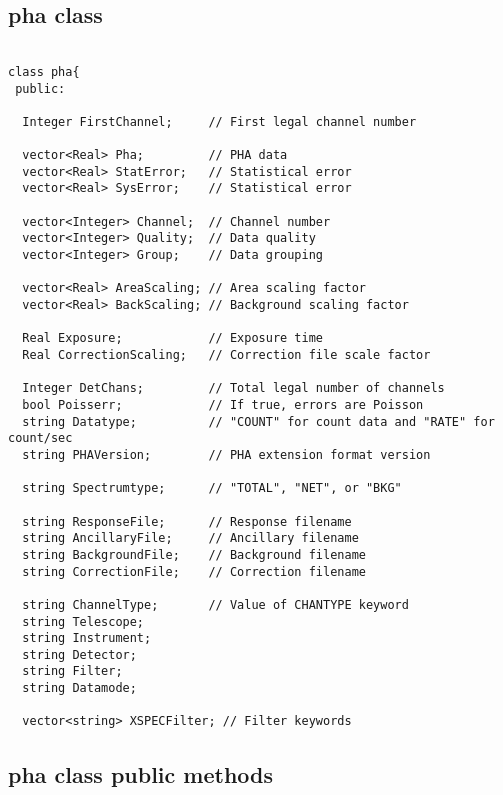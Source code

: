 \documentclass[11pt]{book}
\begin{document}
\subsection{pha class}

\begin{verbatim}

class pha{
 public:

  Integer FirstChannel;     // First legal channel number

  vector<Real> Pha;         // PHA data
  vector<Real> StatError;   // Statistical error 
  vector<Real> SysError;    // Statistical error 

  vector<Integer> Channel;  // Channel number
  vector<Integer> Quality;  // Data quality 
  vector<Integer> Group;    // Data grouping 

  vector<Real> AreaScaling; // Area scaling factor 
  vector<Real> BackScaling; // Background scaling factor 

  Real Exposure;            // Exposure time 
  Real CorrectionScaling;   // Correction file scale factor 

  Integer DetChans;         // Total legal number of channels
  bool Poisserr;            // If true, errors are Poisson 
  string Datatype;          // "COUNT" for count data and "RATE" for count/sec 
  string PHAVersion;        // PHA extension format version 

  string Spectrumtype;      // "TOTAL", "NET", or "BKG" 

  string ResponseFile;      // Response filename 
  string AncillaryFile;     // Ancillary filename 
  string BackgroundFile;    // Background filename 
  string CorrectionFile;    // Correction filename 

  string ChannelType;       // Value of CHANTYPE keyword 
  string Telescope;                                          
  string Instrument;
  string Detector;
  string Filter;
  string Datamode;

  vector<string> XSPECFilter; // Filter keywords 
\end{verbatim}

\subsection{pha class public methods}
\end{document}
